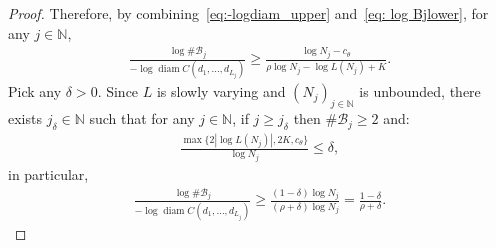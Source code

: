 \documentclass[12pt,reqno]{amsart}
\theoremstyle{definition}
\theoremstyle{plain}
\begin{document}
\begin{proof}
Therefore, by combining~\eqref{eq:-logdiam_upper} and~\eqref{eq: log Bjlower}, for any $j\in\mathbb{N}$,
\begin{align*}
    \frac{\log\#\mathcal{B}_j}{-\log \operatorname{diam} C(d_1,\ldots,d_{L_j})}
    \geq
    \frac{\log{N_j} - c_\theta }{\rho\log{N_j} - \log{L(N_j)} +K}.
\end{align*}
Pick any $\delta>0$. Since $L$ is slowly varying and $(N_j)_{j\in\mathbb{N}}$ is unbounded, there exists $j_{\delta}\in\mathbb{N}$ such that for any $j\in\mathbb{N}$, if $j\geq j_{\delta}$ then $\#\mathcal{B}_j\geq2$ and:
\begin{align*}
    \frac{\max{\{2\left|\log L(N_j)\right|,2K,c_\theta\}}}{\log{N_j}}
    \leq\delta,
\end{align*}
in particular,
\begin{align*}
    \frac{\log\#\mathcal{B}_j}{-\log \operatorname{diam} C(d_1,\ldots,d_{L_j})}
    \geq
    \frac{(1-\delta)\log N_j}{(\rho+\delta)\log N_j}
    =
    \frac{1-\delta}{\rho+\delta}.
\end{align*}
\end{proof}
\end{document}
